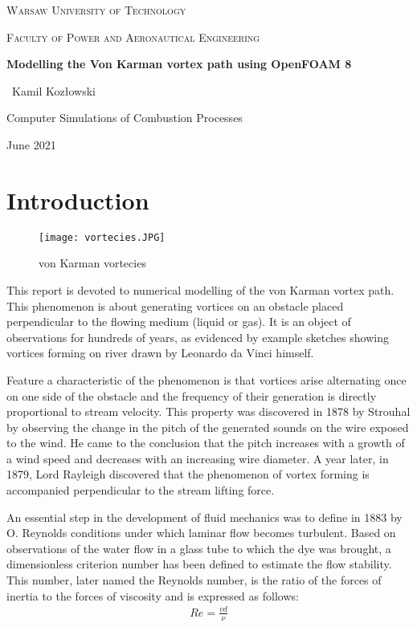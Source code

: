 \documentclass[a4paper,11pt]{article}
\begin{document}
\begin{titlepage}
  \centering
  {\scshape\LARGE Warsaw University of Technology \par}
  \vspace{1cm}
  {\scshape\Large Faculty of Power and Aeronautical Engineering\par}
  \vspace{5cm}
  {\huge\bfseries Modelling the Von Karman vortex path using OpenFOAM 8\par}
  \vspace{5cm}
  {\Large\ Kamil Kozłowski\par}
  \vfill
  Computer Simulations of Combustion Processes\par
  \vfill

  {\large June 2021\par}
\end{titlepage}

\tableofcontents
\newpage



\section{Introduction}


\begin{figure}[h]
  \centering
  \texttt{[image: vortecies.JPG]}
  \caption{von Karman vortecies}
\end{figure}

This report is devoted to numerical modelling of the von Karman vortex path. This phenomenon is about generating vortices on an obstacle placed perpendicular to the flowing medium (liquid or gas). It is an object of observations for hundreds of years, as evidenced by example sketches showing vortices forming on
river drawn by Leonardo da Vinci himself. \par			Feature a characteristic of the phenomenon is that vortices arise alternating once on one side of the obstacle and the frequency of their generation is directly proportional to stream velocity. This property was discovered in 1878 by Strouhal by observing the change in the pitch of the generated sounds on the wire exposed to the wind. He came to
the conclusion that the pitch increases with a growth of a wind speed and decreases with an increasing wire diameter. A year later, in 1879, Lord Rayleigh discovered that the phenomenon of vortex forming is accompanied perpendicular to the stream
lifting force.\par
An essential step in the development of fluid mechanics
was to define in 1883 by O. Reynolds
conditions under which laminar flow becomes
turbulent. Based on observations of the water flow in a glass tube to which the dye was brought, a dimensionless criterion number has been defined
to estimate the flow stability. This number,
later named the Reynolds number, is the ratio of the forces of inertia to the forces of viscosity and is expressed as follows:
\begin{gather*}
  Re = \frac{vd}{\nu}
\end{gather*}
\end{document}
